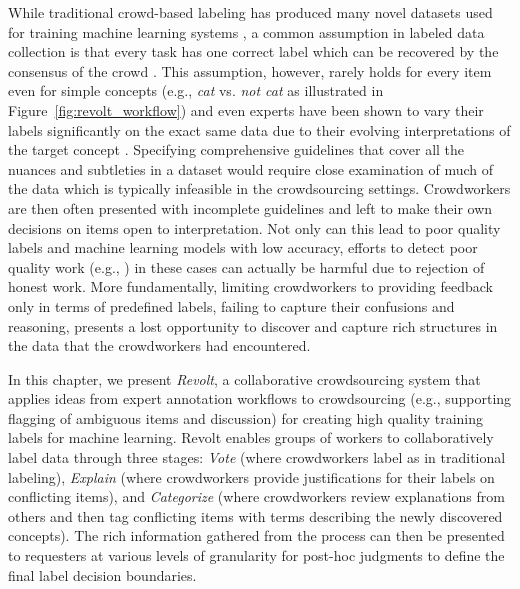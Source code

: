 While traditional crowd-based labeling has produced many novel datasets used for training machine learning systems \cite{deng2009imagenet,krizhevsky2012imagenet,post2012constructing}, a common assumption in labeled data collection is that every task has one correct label which can be recovered by the consensus of the crowd \cite{bachrach2012grade}. This assumption, however, rarely holds for every item even for simple concepts (e.g., \emph{cat} vs. \emph{not cat} as illustrated in Figure~\ref{fig:revolt_workflow}) and even experts have been shown to vary their labels significantly on the exact same data due to their evolving interpretations of the target concept \cite{kulesza2014structured}. Specifying comprehensive guidelines that cover all the nuances and subtleties in a dataset would require close examination of much of the data which is typically infeasible in the crowdsourcing settings.  Crowdworkers are then often presented with incomplete guidelines and left to make their own decisions on items open to interpretation. Not only can this lead to poor quality labels and machine learning models with low accuracy, efforts to detect poor quality work (e.g.,  \cite{ipeirotis2010quality,callison2010creating,hansen2013quality}) in these cases can actually be harmful due to rejection of honest work. More fundamentally, limiting crowdworkers to providing feedback only in terms of predefined labels, failing to capture their confusions and reasoning, presents a lost opportunity to discover and capture rich structures in the data that the crowdworkers had encountered. %

In this chapter, we present \emph{Revolt}, a collaborative crowdsourcing system that applies ideas from expert annotation workflows to crowdsourcing (e.g., supporting flagging of ambiguous items and discussion) for creating high quality training labels for machine learning.  Revolt enables groups of workers to collaboratively label data through three stages: \textit{Vote} (where crowdworkers label as in traditional labeling), \textit{Explain} (where crowdworkers provide justifications for their labels on conflicting items), and \textit{Categorize} (where crowdworkers review explanations from others and then tag conflicting items with terms describing the newly discovered concepts). The rich information gathered from the process can then be presented to requesters at various levels of granularity for post-hoc judgments to define the final label decision boundaries.  

